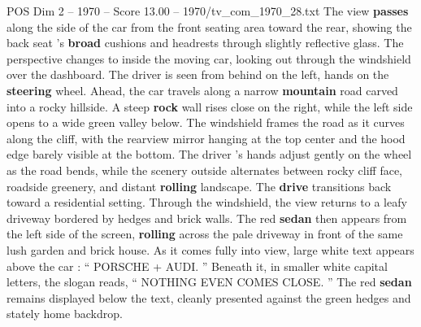 \begin{textsample}{POS Dim 2 – 1970 – Score 13.00 – 1970/tv\_com\_1970\_28.txt}
The view \textbf{passes} along the side of the car from the front seating area toward the rear, showing the back seat ’s \textbf{broad} cushions and headrests through slightly reflective glass.
The perspective changes to inside the moving car, looking out through the windshield over the dashboard.
The driver is seen from behind on the left, hands on the \textbf{steering} wheel.
Ahead, the car travels along a narrow \textbf{mountain} road carved into a rocky hillside.
A steep \textbf{rock} wall rises close on the right, while the left side opens to a wide green valley below.
The windshield frames the road as it curves along the cliff, with the rearview mirror hanging at the top center and the hood edge barely visible at the bottom.
The driver ’s hands adjust gently on the wheel as the road bends, while the scenery outside alternates between rocky cliff face, roadside greenery, and distant \textbf{rolling} landscape.
The \textbf{drive} transitions back toward a residential setting.
Through the windshield, the view returns to a leafy driveway bordered by hedges and brick walls.
The red \textbf{sedan} then appears from the left side of the screen, \textbf{rolling} across the pale driveway in front of the same lush garden and brick house.
As it comes fully into view, large white text appears above the car : “ PORSCHE + AUDI. ” Beneath it, in smaller white capital letters, the slogan reads, “ NOTHING EVEN COMES CLOSE. ” The red \textbf{sedan} remains displayed below the text, cleanly presented against the green hedges and stately home backdrop.

\end{textsample}
